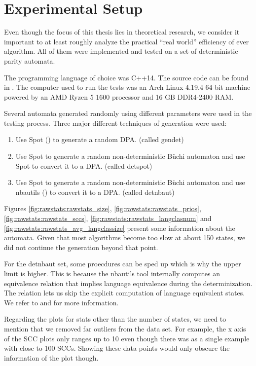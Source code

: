 



\section{Experimental Setup}
Even though the focus of this thesis lies in theoretical research, we consider it important to at least roughly analyze the practical \enquote{real world} efficiency of ever algorithm. All of them were implemented and tested on a set of deterministic parity automata.

The programming language of choice was C++14. The source code can be found in \cite{Tollkoetter2018}. The computer used to run the tests was an Arch Linux 4.19.4 64 bit machine powered by an AMD Ryzen 5 1600 processor and 16 GB DDR4-2400 RAM.

Several automata generated randomly using different parameters were used in the testing process. Three major different techniques of generation were used:

\begin{enumerate}
	\item Use Spot (\cite{duret.16.atva2}) to generate a random DPA. (called \textsf{gendet})
	\item Use Spot to generate a random non-deterministic B\"uchi automaton and use Spot to convert it to a DPA. (called \textsf{detspot})
	\item Use Spot to generate a random non-deterministic B\"uchi automaton and use nbautils (\cite{Pirogov2018}) to convert it to a DPA. (called \textsf{detnbaut})
\end{enumerate}

Figures \ref{fig:rawstats:rawstats_size}, \ref{fig:rawstats:rawstats_prios}, \ref{fig:rawstats:rawstats_sccs}, \ref{fig:rawstats:rawstats_langclasnum} and \ref{fig:rawstats:rawstats_avg_langclassize} present some information about the automata. Given that most algorithms become too slow at about 150 states, we did not continue the generation beyond that point. 

For the \textsf{detnbaut} set, some proecdures can be sped up which is why the upper limit is higher. This is because the nbautils tool internally computes an equivalence relation that implies language equivalence during the determinization. The relation lets us skip the explicit computation of language equivalent states. We refer to \cite{Schewe2009} and \cite{Piterman2007} for more information.

Regarding the plots for stats other than the number of states, we need to mention that we removed far outliers from the data set. For example, the x axis of the SCC plots only ranges up to 10 even though there was as a single example with close to 100 SCCs. Showing these data points would only obscure the information of the plot though.

